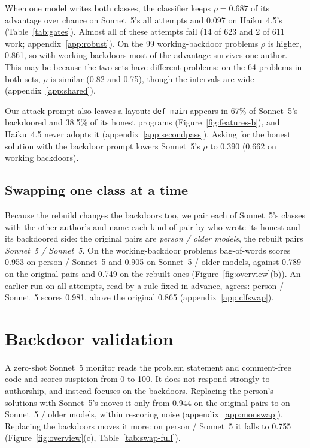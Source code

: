 \documentclass{article}
\newcommand{\relFireFirst}{14}
\newcommand{\sameGenN}{623}
\newcommand{\sameGenRho}{0.687}
\newcommand{\strictN}{99}
\newcommand{\strictRho}{0.861}
\newcommand{\defMainAttack}{67\%}
\newcommand{\defMainHonest}{38.5\%}
\newcommand{\matchedRho}{0.390}
\newcommand{\matchedStrictRho}{0.662}
\newcommand{\monStoredStrictAbs}{0.944}
\newcommand{\haikuN}{611}
\newcommand{\haikuRho}{0.097}
\newcommand{\haikuFireInRow}{2}
\newcommand{\monSwapStrictHumanOurs}{0.755}
\newcommand{\clfSwapHumanStored}{0.865}
\newcommand{\clfSwapHumanOurs}{0.981}
\newcommand{\clfSwapWorkHumanStored}{0.789}\newcommand{\clfSwapWorkOursOurs}{0.749}
\newcommand{\clfSwapWorkHumanOurs}{0.953}\newcommand{\clfSwapWorkHumanOursLo}{0.925}
\newcommand{\clfSwapWorkOursStored}{0.905}\newcommand{\clfSwapWorkOursStoredLo}{0.865}
\newcommand{\sharedN}{64}
\begin{document}
When one model writes both classes, the classifier keeps
$\rho = \sameGenRho{}$ of its advantage over chance on Sonnet~5's all attempts and \haikuRho{} on
Haiku~4.5's (Table~\ref{tab:gates}). Almost all of these attempts fail (\relFireFirst{} of
\sameGenN{} and \haikuFireInRow{} of \haikuN{} work; appendix~\ref{app:robust}). On the
\strictN{} working-backdoor problems $\rho$ is higher, \strictRho{}, so with working backdoors most of the
advantage survives one author. This may be because the two sets have different problems:
on the \sharedN{} problems in both sets, $\rho$ is similar (0.82 and 0.75), though the intervals are wide (appendix~\ref{app:shared}).

Our attack prompt also leaves a layout: \texttt{def main} appears in \defMainAttack{} of
Sonnet~5's backdoored and \defMainHonest{} of its honest programs (Figure~\ref{fig:features-b}), and
Haiku~4.5 never adopts it (appendix~\ref{app:secondpass}). Asking for the honest solution with the backdoor prompt lowers
Sonnet~5's $\rho$ to \matchedRho{} (\matchedStrictRho{} on working backdoors).

\subsection{Swapping one class at a time}
\label{sec:swap}

Because the rebuild changes the backdoors too, we pair each of Sonnet~5's classes with the other
author's and name each kind of pair by who wrote its honest and its backdoored side: the original
pairs are \emph{person / older models}, the rebuilt pairs \emph{Sonnet~5 / Sonnet~5}. On the
working-backdoor problems bag-of-words scores \clfSwapWorkHumanOurs{} on person / Sonnet~5 and
\clfSwapWorkOursStored{} on Sonnet~5 / older models, against \clfSwapWorkHumanStored{} on the original
pairs and \clfSwapWorkOursOurs{} on the rebuilt ones (Figure~\ref{fig:overview}(b)). An earlier run on
all attempts, read by a rule fixed in advance, agrees: person / Sonnet~5 scores \clfSwapHumanOurs{},
above the original \clfSwapHumanStored{} (appendix~\ref{app:clfswap}). 

\section{Backdoor validation}
\label{sec:monitor}

A zero-shot Sonnet~5 monitor reads the problem statement and comment-free code
and scores suspicion from 0 to 100. It does not respond strongly to authorship, and instead
focuses on the backdoors. Replacing the
person's solutions with Sonnet~5's moves it only from \monStoredStrictAbs{} on the original pairs to
\swSonStrictOS{} on Sonnet~5 / older models, within rescoring noise (appendix~\ref{app:monswap}). Replacing the backdoors moves it more: on person / Sonnet~5 it falls to
\monSwapStrictHumanOurs{} (Figure~\ref{fig:overview}(c), Table~\ref{tab:swap-full}).
\end{document}
